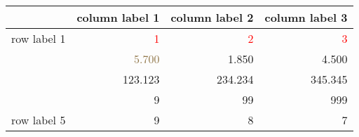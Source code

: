 \begin{tabular}{lrrr} 
\toprule 
  	 & 	 column label 1 	 & 	 column label 2 	 & 	 column label 3 \\ 
\midrule 
row label 1 	 & 	 \textcolor[HTML]{FF0000}{1} 	 & 	 \textcolor[HTML]{FF0000}{2} 	 & 	 \textcolor[HTML]{FF0000}{3} \\ 
\cellcolor[HTML]{FFFFFF}{row label 2} 	 & 	 \textcolor[HTML]{907648}{5.700} 	 & 	 1.850 	 & 	 4.500 \\ 
\cellcolor[HTML]{FFFF00}{row label 3} 	 & 	 123.123 	 & 	 234.234 	 & 	 345.345 \\ 
\cellcolor[HTML]{FF0000}{row label 4} 	 & 	 9 	 & 	 99 	 & 	 999 \\ 
row label 5 	 & 	 9 	 & 	 8 	 & 	 7 \\ 
\bottomrule 
\end{tabular}